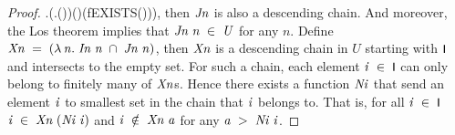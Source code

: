 \documentclass[letterpaper]{article}
\renewcommand{\HOLConst}[1]{{\textsf{\upshape\small #1}}}
\renewcommand{\HOLinline}[1]{\ensuremath{#1}}
\begin{document}
\begin{proof}
\;\;\;\;\;\;\;\;\;\;\;\HOLSymConst{\HOLTokenIn{}}\;\HOLConst{I}\;\HOLSymConst{\HOLTokenConj{}}\;\HOLSymConst{\HOLTokenForall{}}\HOLBoundVar{\ensuremath{\sigma}}.\;(\HOLSymConst{\HOLTokenForall{}}.\;\;\HOLSymConst{\HOLTokenIn{}}\;\;\HOLSymConst{\HOLTokenImp{}}\;\HOLBoundVar{\ensuremath{\sigma}}\;\;\HOLSymConst{=}\;\HOLConst{CHOICE}\;(\;)\;)\;\HOLSymConst{\HOLTokenImp{}}\;\HOLConst{feval}\;(\;)\;\HOLBoundVar{\ensuremath{\sigma}}\;(\HOLConst{fEXISTS}\;\;(\;))\HOLTokenRightbrace{}), then \HOLinline{\HOLFreeVar{Jn}} is also a descending chain. And moreover, the Los theorem implies that \HOLinline{\HOLFreeVar{Jn}\;\HOLFreeVar{n}\;\HOLSymConst{\HOLTokenIn{}}\;\HOLFreeVar{U}} for any $n$. Define \HOLinline{\HOLFreeVar{Xn}\;\HOLSymConst{=}\;(\HOLTokenLambda{}\HOLBoundVar{n}.\;\HOLFreeVar{In}\;\HOLBoundVar{n}\;\HOLSymConst{\HOLTokenInter{}}\;\HOLFreeVar{Jn}\;\HOLBoundVar{n})}, then \HOLinline{\HOLFreeVar{Xn}} is a descending chain in $U$ starting with \HOLinline{\HOLConst{I}} and intersects to the empty set. For such a chain, each element \HOLinline{\HOLFreeVar{i}\;\HOLSymConst{\HOLTokenIn{}}\;\HOLConst{I}} can only belong to finitely many of \HOLinline{\HOLFreeVar{Xn}}s. Hence there exists a function \HOLinline{\HOLFreeVar{Ni}} that send an element \HOLinline{\HOLFreeVar{i}} to smallest set in the chain that \HOLinline{\HOLFreeVar{i}} belongs to. That is, for all \HOLinline{\HOLFreeVar{i}\;\HOLSymConst{\HOLTokenIn{}}\;\HOLConst{I}} \HOLinline{\HOLFreeVar{i}\;\HOLSymConst{\HOLTokenIn{}}\;\HOLFreeVar{Xn}\;(\HOLFreeVar{Ni}\;\HOLFreeVar{i})} and \HOLinline{\HOLFreeVar{i}\;\HOLSymConst{\HOLTokenNotIn{}}\;\HOLFreeVar{Xn}\;\HOLFreeVar{a}} for any \HOLinline{\HOLFreeVar{a}\;\HOLSymConst{\HOLTokenGt{}}\;\HOLFreeVar{Ni}\;\HOLFreeVar{i}}.


\end{proof}
\end{document}
